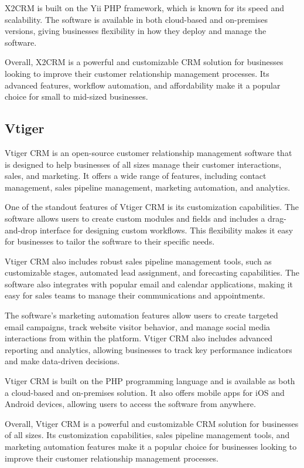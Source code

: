 \documentclass{article}
\begin{document}
X2CRM is built on the Yii PHP framework, which is known for its speed and scalability. The software is available in both cloud-based and on-premises versions, giving businesses flexibility in how they deploy and manage the software.

Overall, X2CRM is a powerful and customizable CRM solution for businesses looking to improve their customer relationship management processes. Its advanced features, workflow automation, and affordability make it a popular choice for small to mid-sized businesses.

\subsection{Vtiger}

Vtiger CRM is an open-source customer relationship management software that is designed to help businesses of all sizes manage their customer interactions, sales, and marketing. It offers a wide range of features, including contact management, sales pipeline management, marketing automation, and analytics.

One of the standout features of Vtiger CRM is its customization capabilities. The software allows users to create custom modules and fields and includes a drag-and-drop interface for designing custom workflows. This flexibility makes it easy for businesses to tailor the software to their specific needs.

Vtiger CRM also includes robust sales pipeline management tools, such as customizable stages, automated lead assignment, and forecasting capabilities. The software also integrates with popular email and calendar applications, making it easy for sales teams to manage their communications and appointments.

The software's marketing automation features allow users to create targeted email campaigns, track website visitor behavior, and manage social media interactions from within the platform. Vtiger CRM also includes advanced reporting and analytics, allowing businesses to track key performance indicators and make data-driven decisions.

Vtiger CRM is built on the PHP programming language and is available as both a cloud-based and on-premises solution. It also offers mobile apps for iOS and Android devices, allowing users to access the software from anywhere.

Overall, Vtiger CRM is a powerful and customizable CRM solution for businesses of all sizes. Its customization capabilities, sales pipeline management tools, and marketing automation features make it a popular choice for businesses looking to improve their customer relationship management processes.
\end{document}
